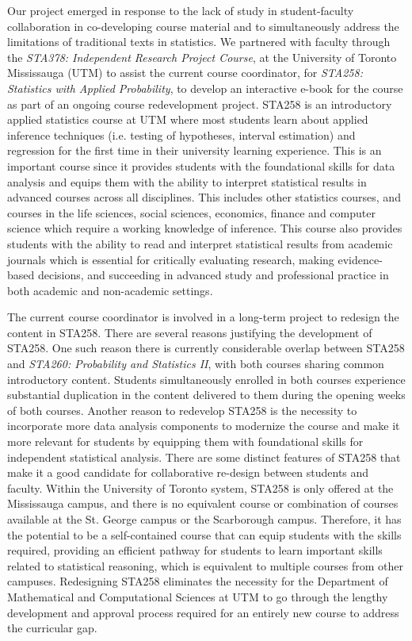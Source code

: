 \documentclass[11pt]{article}
\begin{document}
Our project emerged in response to the lack of study in student-faculty collaboration in co-developing course material and to simultaneously address the limitations of traditional texts in statistics. 
We partnered with faculty through the \textit{STA378: Independent Research Project Course}, at the University of Toronto Mississauga (UTM) to assist the current course coordinator, for \textit{STA258: Statistics with Applied Probability}, to develop an interactive e-book for the course as part of an ongoing course redevelopment project.
STA258 is an introductory applied statistics course at UTM where most students learn about applied inference techniques (i.e. testing of hypotheses, interval estimation) and regression for the first time in their university learning experience.
This is an important course since it provides students with the foundational skills for data analysis and equips them with the ability to interpret statistical results in advanced courses across all disciplines.
This includes other statistics courses, and courses in the life sciences, social sciences, economics, finance and computer science which require a working knowledge of inference.
This course also provides students with the ability to read and interpret statistical results from academic journals which is essential for critically evaluating research, making evidence-based decisions, and succeeding in advanced study and professional practice in both academic and non-academic settings.

The current course coordinator is involved in a long-term project to redesign the content in STA258. 
There are several reasons justifying the development of STA258.
One such reason there is currently considerable overlap between STA258 and \textit{STA260: Probability and Statistics II}, with both courses sharing common introductory content.
Students simultaneously enrolled in both courses experience substantial duplication in the content delivered to them during the opening weeks of both courses.
Another reason to redevelop STA258 is the necessity to incorporate more data analysis components to modernize the course and make it more relevant for students by equipping them with foundational skills for independent statistical analysis.
There are some distinct features of STA258 that make it a good candidate for collaborative re-design between students and faculty.
Within the University of Toronto system, STA258 is only offered at the Mississauga campus, and there is no equivalent course or combination of courses available at the St. George campus or the Scarborough campus.
Therefore, it has the potential to be a self-contained course that can equip students with the skills required, providing an efficient pathway for students to learn important skills related to statistical reasoning, which is equivalent to multiple courses from other campuses. 
Redesigning STA258 eliminates the necessity for the Department of Mathematical and Computational Sciences at UTM to go through the lengthy development and approval process required for an entirely new course to address the curricular gap.
\end{document}
